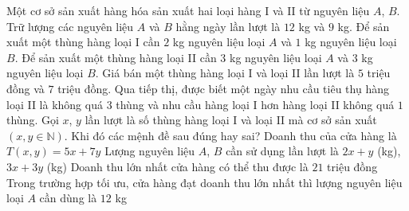 \begin{ex}%
	Một cơ sở sản xuất hàng hóa sản xuất hai loại hàng I và II từ nguyên liệu $A$, $B$. Trữ lượng các nguyên liệu $A$ và $B$ hằng ngày lần lượt là $12$ kg và $9$ kg. Để sản xuất một thùng hàng loại I cần $2$ kg nguyên liệu loại $A$ và $1$ kg nguyên liệu loại $B$. Để sản xuất một thùng hàng loại II cần $3$ kg nguyên liệu loại $A$ và $3$ kg nguyên liệu loại $B$. Giá bán một thùng hàng loại I và loại II lần lượt là $5$ triệu đồng và $7$ triệu đồng. Qua tiếp thị, được biết một ngày nhu cầu tiêu thụ hàng loại II là không quá $3$ thùng và nhu cầu hàng loại I hơn hàng loại II không quá $1$ thùng. Gọi $x$, $y$ lần lượt là số thùng hàng loại I và loại II mà cơ sở sản xuất $\left( x, y\in \mathbb{N} \right)$. Khi đó các mệnh đề sau đúng hay sai?
	\choiceTF
	{\True Doanh thu của cửa hàng là $T\left( x, y \right)=5x+7y$}
	{Lượng nguyên liệu $A$, $B$ cần sử dụng lần lượt là $2x+y$ (kg), $3x+3y$ (kg)}
	{Doanh thu lớn nhất cửa hàng có thể thu được là $21$ triệu đồng}
	{\True Trong trường hợp tối ưu, cửa hàng đạt doanh thu lớn nhất thì lượng nguyên liệu loại $A$ cần dùng là $12$ kg}
\end{ex}
